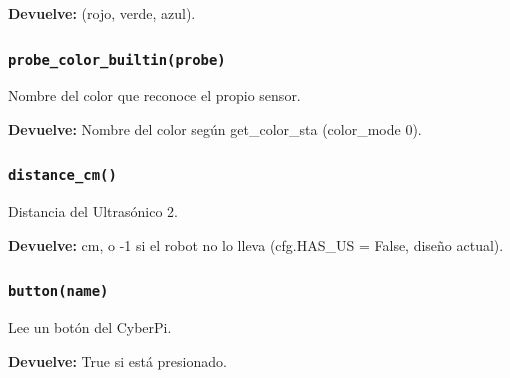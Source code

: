 \par{}\par\smallskip
\noindent\textbf{Devuelve:} (rojo, verde, azul).\par

\subsubsection{\texttt{probe\_\allowbreak{}color\_\allowbreak{}builtin(probe)}}\label{fn:hal:probe-color-builtin}
\noindent Nombre del color que reconoce el propio sensor.

\par{}\par\smallskip
\noindent\textbf{Devuelve:} Nombre del color según get\_color\_sta (color\_mode 0).\par

\subsubsection{\texttt{distance\_\allowbreak{}cm()}}\label{fn:hal:distance-cm}
\noindent Distancia del Ultrasónico 2.

\noindent\textbf{Devuelve:} cm, o -1 si el robot no lo lleva (cfg.HAS\_US = False, diseño actual).\par

\subsubsection{\texttt{button(name)}}\label{fn:hal:button}
\noindent Lee un botón del CyberPi.

\par{}\par\smallskip
\noindent\textbf{Devuelve:} True si está presionado.\par

